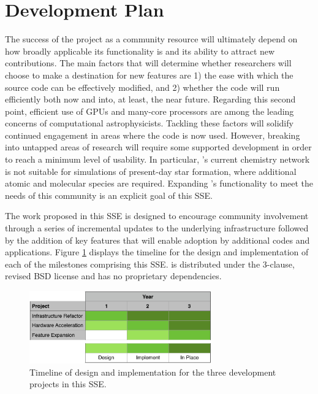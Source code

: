 \section{Development Plan}

The success of the \grackle{} project as a community resource will
ultimately depend on how broadly applicable its functionality is and
its ability to attract new contributions.  The main factors
that will determine whether researchers will choose to make \grackle{}
a destination for new features are 1) the ease with which the source
code can be effectively modified, and 2) whether the code will run
efficiently both now and into, at least, the near future.  Regarding
this second point, efficient use of GPUs and many-core processors are
among the leading concerns of computational astrophysicists.  Tackling
these factors will solidify continued engagement in areas where the
code is now used.  However, breaking into untapped areas of research
will require some supported development in order to reach a minimum
level of usability.  In particular, \grackle{}'s current chemistry
network is not suitable for simulations of present-day star formation,
where additional atomic and molecular species are required.  Expanding
\grackle{}'s functionality to meet the needs of this community is an
explicit goal of this SSE.

The work proposed in this SSE is designed to encourage community
involvement through a series of incremental updates to the underlying
infrastructure followed by the addition of key features that will
enable adoption by additional codes and applications.  Figure
\ref{fig:gantt} displays the timeline for the design and
implementation of each of the milestones comprising this SSE.
\grackle{} is distributed under the 3-clause, revised BSD license and
has no proprietary dependencies.

\begin{figure}
\begin{center}
\includegraphics[width=0.7\textwidth]{figures/gantt.pdf}
\caption{Timeline of design and implementation for the three
  development projects in this SSE.}
\label{fig:gantt}
\end{center}
\vspace*{-2\baselineskip}
\end{figure}

